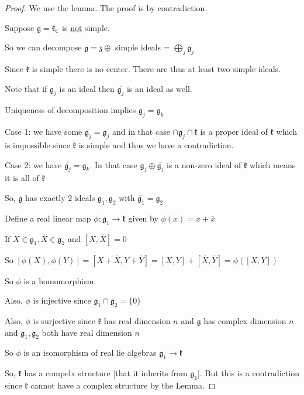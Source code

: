 \documentclass{article}
\theoremstyle{definition}
\begin{document}
\begin{proof}
    We use the lemma. The proof is by contradiction.

    Suppose \(\mathfrak{g}=\mathfrak{k}_\mathbb{C}  \) is \underline{not} simple.
    
    So we can decompose \(\mathfrak{g}=\mathfrak{z} \oplus \) simple ideals = \(\bigoplus_{j}^{} \mathfrak{g} _j\) 
    
    Since \(\mathfrak{k} \) is simple there is no center. There are thus at least two simple ideals.

    Note that if \(\mathfrak{g} _j\) is an ideal then \(\overline{\mathfrak{g} _j} \) is an ideal as well.

    Uniqueness of decomposition implies \(\overline{\mathfrak{g} _j} = \mathfrak{g} _k\) 

    Case 1: we have some \(\overline{\mathfrak{g} _j} =\mathfrak{g} _j\) and in that case \(\cap \mathfrak{g} _j\cap \mathfrak{k} \) is a proper ideal of \(\mathfrak{k} \) which is impossible since \(\mathfrak{k} \) is simple and thus we have a contradiction.

    Case 2: we have \(\overline{\mathfrak{g}_j }=\mathfrak{g}_k\). In that case \(\mathfrak{g}_j \oplus \overline{\mathfrak{g}_j }  \) is a non-zero ideal of \(\mathfrak{k} \) which means it is all of \(\mathfrak{k} \) 
    
    So, \(\mathfrak{g} \) has exactly \(2\) ideals \(\mathfrak{g_1},\mathfrak{g}_2 \) with \(\overline{\mathfrak{g}_1 }=\mathfrak{g}_2   \)  

    Define a real linear map \(\phi:\mathfrak{g}_1 \to \mathfrak{k} \) given by \(\phi(x)=x+\overline{x} \) 
    
    If \(X\in \mathfrak{g}_1,\overline{X} \in \mathfrak{g}_2  \)  and \([X,\overline{X} ]=0\) 

    So \([\phi(X),\phi(Y)]=[X+\overline{X},Y+\overline{Y}  ]=[X,Y]+[\overline{X},\overline{Y}]=\phi([X,Y])\) 

    So \(\phi\) is a homomorphism.

    Also, \(\phi\) is injective since \(\mathfrak{g}_1\cap \mathfrak{g}_2=\{ 0 \}   \) 

    Also, \(\phi\) is surjective since \(\mathfrak{k} \) has real dimension \(n\) and \(\mathfrak{g} \) has complex dimension \(n\) and \(\mathfrak{g}_1,\mathfrak{g}_2 \) both have real dimension \(n\) 
    
    So \(\phi\) is an isomorphism of real lie algebras \(\mathfrak{g}_1 \to \mathfrak{k} \) 

    So, \(\mathfrak{k} \) has a compelx structure [that it inherits from \(\mathfrak{g} _1\)]. But this is a contradiction since \(\mathfrak{k} \) cannot have a complex structure by the Lemma.

\end{proof}
\end{document}
